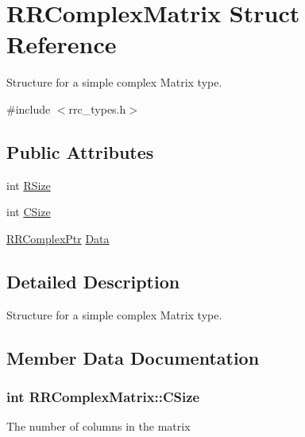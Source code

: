 \hypertarget{struct_r_r_complex_matrix}{}\section{R\+R\+Complex\+Matrix Struct Reference}
\label{struct_r_r_complex_matrix}


Structure for a simple complex Matrix type.  




{\ttfamily \#include $<$rrc\+\_\+types.\+h$>$}

\subsection*{Public Attributes}
\begin{DoxyCompactItemize}
\item 
int \hyperlink{struct_r_r_complex_matrix_ad576272aa8a6bbd752dc3628307f512a}{R\+Size}
\item 
int \hyperlink{struct_r_r_complex_matrix_ac78072d57b04058c4a816b23abcdff2a}{C\+Size}
\item 
\hyperlink{rrc__types_8h_ada2046d7326c56ae29d8510fbf6622ee}{R\+R\+Complex\+Ptr} \hyperlink{struct_r_r_complex_matrix_ade1afed558e746cb1f1c375ed3b8240a}{Data}
\end{DoxyCompactItemize}


\subsection{Detailed Description}
Structure for a simple complex Matrix type. 

\subsection{Member Data Documentation}
\hypertarget{struct_r_r_complex_matrix_ac78072d57b04058c4a816b23abcdff2a}{}
\subsubsection[{C\+Size}]{\setlength{\rightskip}{0pt plus 5cm}int R\+R\+Complex\+Matrix\+::\+C\+Size}\label{struct_r_r_complex_matrix_ac78072d57b04058c4a816b23abcdff2a}
The number of columns in the matrix \hypertarget{struct_r_r_complex_matrix_ade1afed558e746cb1f1c375ed3b8240a}{}

